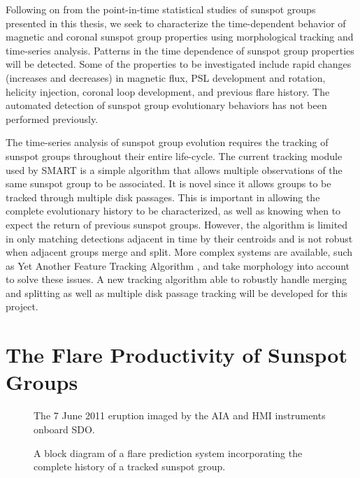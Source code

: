 Following on from the point-in-time statistical studies of sunspot groups presented in this thesis, we seek to characterize the time-dependent behavior of magnetic and coronal sunspot group properties using morphological tracking and time-series analysis. Patterns in the time dependence of sunspot group properties will be detected. Some of the properties to be investigated include rapid changes (increases and decreases) in magnetic flux, PSL development and rotation, helicity injection, coronal loop development, and previous flare history. The automated detection of sunspot group evolutionary behaviors has not been performed previously. 

The time-series analysis of sunspot group evolution requires the tracking of sunspot groups throughout their entire life-cycle. The current tracking module used by \gls{SMART} is a simple algorithm that allows multiple observations of the same sunspot group to be associated. It is novel since it allows groups to be tracked through multiple disk passages. This is important in allowing the complete evolutionary history to be characterized, as well as knowing when to expect the return of previous sunspot groups. However, the algorithm is limited in only matching detections adjacent in time by their centroids and is not robust when adjacent groups merge and split. More complex systems are available, such as Yet Another Feature Tracking Algorithm \citep[YAFTA;][]{Welsch:2003}, and take morphology into account to solve these issues. A new tracking algorithm able to robustly handle merging and splitting as well as multiple disk passage tracking will be developed for this project.


\section{The Flare Productivity of Sunspot Groups}

\begin{figure}[!t]
\caption[The 7 June 2011 eruption.]{The 7 June 2011 eruption imaged by the AIA and HMI instruments onboard SDO.}
\label{fig:june7thzoom}
\end{figure}

\begin{figure}[!t]
\caption[A block diagram of a flare prediction system.]{A block diagram of a flare prediction system incorporating the complete history of a tracked sunspot group.}
\label{fig:flareblock}
\end{figure}

